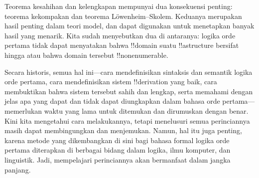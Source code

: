 \documentclass[../../../include/open-logic-section]{subfiles}
\begin{document}
Teorema kesahihan dan kelengkapan mempunyai dua konsekuensi penting: teorema
kekompakan dan teorema L\"owenheim--Skolem. Keduanya merupakan hasil penting
dalam teori model, dan dapat digunakan untuk menetapkan banyak hasil yang
menarik. Kita sudah menyebutkan dua di antaranya: logika orde pertama tidak
dapat menyatakan bahwa !!{domain} suatu !!a{structure} bersifat hingga atau
bahwa domain tersebut !!{nonenumerable}.

Secara historis, semua hal ini---cara mendefinisikan sintaksis dan semantik
logika orde pertama, cara mendefinisikan sistem !!{derivation} yang baik, cara
membuktikan bahwa sistem tersebut sahih dan lengkap, serta memahami dengan
jelas apa yang dapat dan tidak dapat diungkapkan dalam bahasa orde pertama---
memerlukan waktu yang lama untuk ditemukan dan dirumuskan dengan benar. Kini
kita mengetahui cara melakukannya, tetapi menelusuri semua perinciannya masih
dapat membingungkan dan menjemukan. Namun, hal itu juga penting, karena metode
yang dikembangkan di sini bagi bahasa formal logika orde pertama diterapkan
di berbagai bidang dalam logika, ilmu komputer, dan linguistik. Jadi,
mempelajari perinciannya akan bermanfaat dalam jangka panjang.
\end{document}
